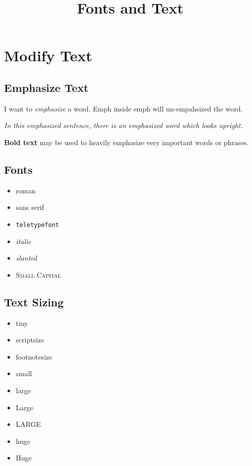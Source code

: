 \documentclass{article}
\title{Fonts and Text}
\date{}
\author{}
\begin{document}
	\maketitle	
	\section{Modify Text}
	\subsection{Emphasize Text}
	I want to \emph{emphasize} a word. Emph inside emph will un-empahsized the word.	
	
	\emph{In this emphasized sentence, there is an emphasized \emph{word} which looks upright.}
	
	\textbf{Bold text} may be used to heavily emphasize very important words or phrases.
	
	\subsection{Fonts}	
		\begin{multicols}{3}
		\begin{itemize}
			\item \textrm{roman} 
			\item \textsf{sans serif} 
			\item \texttt{teletypefont}
		\end{itemize}
		\begin{itemize}
			\item \textit{italic}
			\item \textsl{slanted}
			\item \textsc{Small Capital}	
		\end{itemize}
	\end{multicols}
	\subsection{Text Sizing}
		\begin{itemize}
			\item \tiny{tiny}
			\item \scriptsize{scriptsize}
			\item \footnotesize{footnotesize}	
			\item \small{small}
			\item \large{large}
			\item \Large{Large}	
			\item \LARGE{LARGE}
			\item \huge{huge}
			\item \Huge{Huge}
		\end{itemize}
\end{document}
